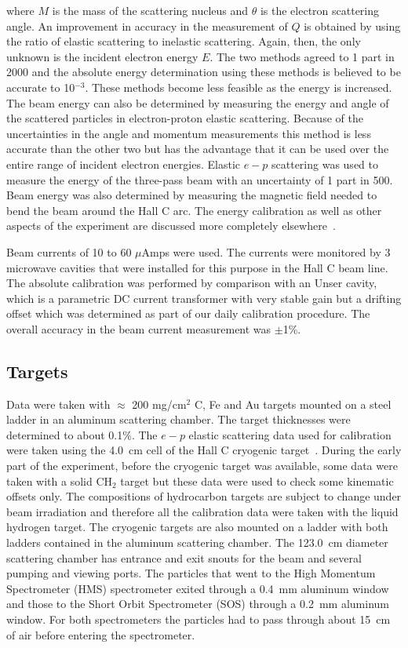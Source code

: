 \documentclass[aps,prl,twocolumn,showpacs,amsmath,amssymb,floats]{revtex4}
\begin{document}
\noindent
where $M$ is the mass of the scattering nucleus and $\theta$ is the electron scattering angle.  An improvement in accuracy in 
the measurement of $Q$ is obtained by using the ratio of elastic scattering to 
inelastic scattering.  Again, then, the only unknown is the incident electron 
energy $E$.  The two methods agreed to 1 part in 2000 and the absolute energy 
determination using these methods is believed to be accurate to 10$^{-3}$.  
These methods become less feasible as the energy is increased.  The beam energy 
can also be determined by measuring the energy and angle of the scattered 
particles in electron-proton elastic scattering.  Because of the uncertainties 
in the angle and momentum measurements this method is less accurate than the 
other two but has the advantage that it can be used over the entire range of 
incident electron energies.  Elastic $e-p$ scattering was used to measure the 
energy of the three-pass beam with an uncertainty of 1 part in 500.  Beam energy 
was also determined by measuring the magnetic field needed to bend the beam around 
the Hall C arc. The energy calibration as well as other 
aspects of the experiment are discussed more completely elsewhere~\cite{thesis}.

Beam currents of 10 to 60 $\mu$Amps were used.  The currents were monitored by 3 
microwave cavities that were installed for this purpose in the Hall C beam 
line\cite{jlab1}.  The absolute calibration was performed by comparison with 
an Unser cavity, which is a parametric DC current transformer with very stable 
gain but a drifting offset which was determined as part of our daily calibration procedure.  The overall accuracy in the 
beam current measurement was $\pm$1\%.

\subsection*{Targets} 

Data were taken with  $\approx$ 200 mg/cm$^2$ C, Fe and Au targets mounted on 
a steel ladder in an aluminum scattering chamber. The target thicknesses were 
determined to about 0.1\%.  The $e-p$ elastic scattering data used for 
calibration were taken using the 4.0~cm cell of the Hall C cryogenic target~\cite{jlab2}. During the early part of the experiment, before the cryogenic target 
was available, some data were taken with a solid CH$_2$ target but these data 
were used to check some kinematic offsets only.  The compositions of hydrocarbon targets are subject to change under beam irradiation and therefore all the 
calibration data were taken with the liquid hydrogen target.  The cryogenic 
targets are also mounted on a ladder with both ladders contained in the 
aluminum scattering chamber.  The 123.0~cm diameter scattering chamber has entrance 
and exit snouts for the beam and several pumping and viewing ports. The 
particles that went to the High Momentum Spectrometer (HMS) spectrometer 
exited through a 0.4~mm aluminum window and those to the Short Orbit Spectrometer (SOS) through a 0.2~mm aluminum window.  For both spectrometers the 
particles had to pass through about 15~cm of air before entering the 
spectrometer.  
\end{document}
